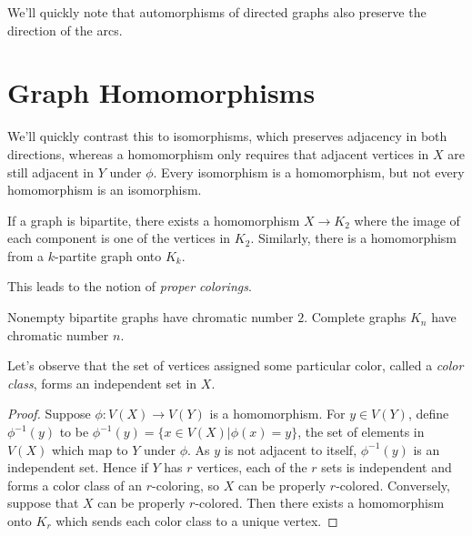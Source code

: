 We'll quickly note that automorphisms of directed graphs also preserve the direction of the arcs.


\section*{Graph Homomorphisms}

We'll quickly contrast this to isomorphisms, which preserves adjacency in both directions, whereas a homomorphism only requires that adjacent vertices in $X$ are still adjacent in $Y$ under $\phi$.  Every isomorphism is a homomorphism, but not every homomorphism is an isomorphism.


If a graph is bipartite, there exists a homomorphism $X\rightarrow K_2$ where the image of each component is one of the vertices in $K_2$.  Similarly, there is a homomorphism from a $k$-partite graph onto $K_k$.

This leads to the notion of \textit{proper colorings}.



Nonempty bipartite graphs have chromatic number $2$.  Complete graphs $K_n$ have chromatic number $n$.

Let's observe that the set of vertices assigned some particular color, called a \textit{color class}, forms an independent set in $X$.



\begin{proof}
	Suppose $\phi:V(X)\rightarrow V(Y)$ is a homomorphism.  For $y\in V(Y)$, define $\phi^{-1}(y)$ to be $\phi^{-1}(y)=\{x\in V(X)|\phi(x)=y\}$, the set of elements in $V(X)$ which map to $Y$ under $\phi$.  As $y$ is not adjacent to itself, $\phi^{-1}(y)$ is an independent set.  Hence if $Y$ has $r$ vertices, each of the $r$ sets is independent and forms a color class of an $r$-coloring, so $X$ can be properly $r$-colored.  Conversely, suppose that $X$ can be properly $r$-colored.  Then there exists a homomorphism onto $K_r$ which sends each color class to a unique vertex.
\end{proof}

